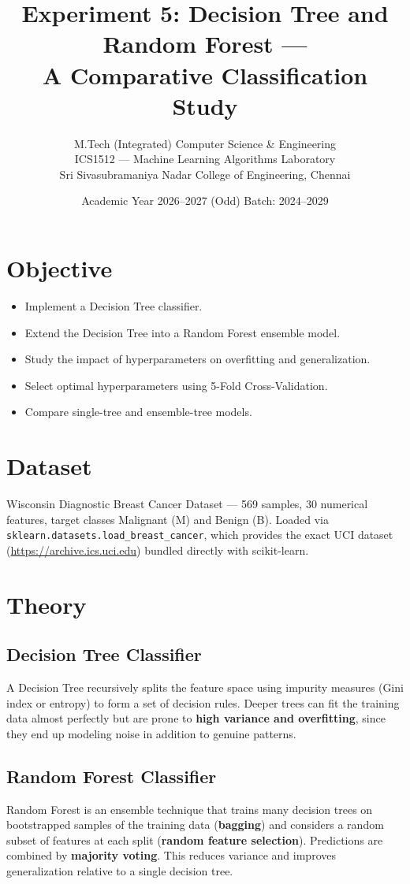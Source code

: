 \documentclass[11pt,a4paper]{article}
\title{\textbf{Experiment 5: Decision Tree and Random Forest --- \\ A Comparative Classification Study}}
\author{
  M.Tech (Integrated) Computer Science \& Engineering \\
  ICS1512 --- Machine Learning Algorithms Laboratory \\
  Sri Sivasubramaniya Nadar College of Engineering, Chennai
}
\date{Academic Year 2026--2027 (Odd) \quad Batch: 2024--2029}
\begin{document}
\maketitle

\section*{Objective}
\begin{itemize}
  \item Implement a Decision Tree classifier.
  \item Extend the Decision Tree into a Random Forest ensemble model.
  \item Study the impact of hyperparameters on overfitting and generalization.
  \item Select optimal hyperparameters using 5-Fold Cross-Validation.
  \item Compare single-tree and ensemble-tree models.
\end{itemize}

\section*{Dataset}
Wisconsin Diagnostic Breast Cancer Dataset --- 569 samples, 30 numerical features, target classes
Malignant (M) and Benign (B). Loaded via \texttt{sklearn.datasets.load\_breast\_cancer}, which provides
the exact UCI dataset (\url{https://archive.ics.uci.edu}) bundled directly with scikit-learn.

\section{Theory}

\subsection{Decision Tree Classifier}
A Decision Tree recursively splits the feature space using impurity measures (Gini index or entropy)
to form a set of decision rules. Deeper trees can fit the training data almost perfectly but are prone
to \textbf{high variance and overfitting}, since they end up modeling noise in addition to genuine
patterns.

\subsection{Random Forest Classifier}
Random Forest is an ensemble technique that trains many decision trees on bootstrapped samples of the
training data (\textbf{bagging}) and considers a random subset of features at each split
(\textbf{random feature selection}). Predictions are combined by \textbf{majority voting}. This reduces
variance and improves generalization relative to a single decision tree.
\end{document}

